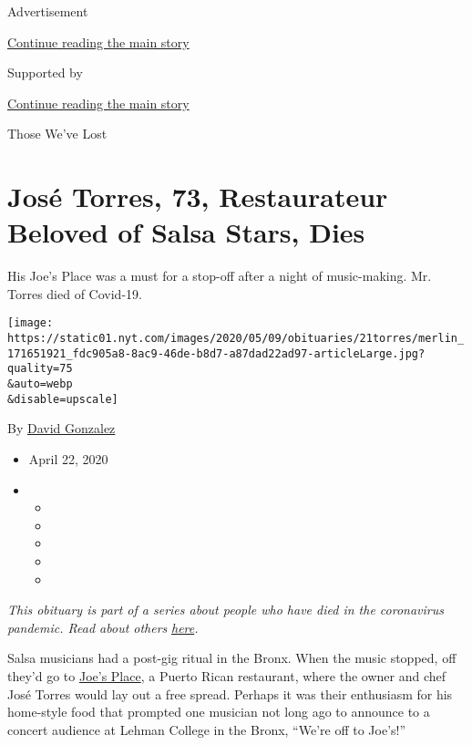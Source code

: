 Advertisement

\protect\hyperlink{after-top}{Continue reading the main story}

Supported by

\protect\hyperlink{after-sponsor}{Continue reading the main story}

Those We've Lost

\hypertarget{josuxe9-torres-73-restaurateur-beloved-of-salsa-stars-dies}{%
\section{José Torres, 73, Restaurateur Beloved of Salsa Stars,
Dies}\label{josuxe9-torres-73-restaurateur-beloved-of-salsa-stars-dies}}

His Joe's Place was a must for a stop-off after a night of music-making.
Mr. Torres died of Covid-19.

\texttt{[image: https://static01.nyt.com/images/2020/05/09/obituaries/21torres/merlin\_171651921\_fdc905a8-8ac9-46de-b8d7-a87dad22ad97-articleLarge.jpg?quality=75\\\&auto=webp\\\&disable=upscale]}

By \href{https://www.nytimes.com/by/david-gonzalez}{David Gonzalez}

\begin{itemize}
\item
  April 22, 2020
\item
  \begin{itemize}
  \item
  \item
  \item
  \item
  \item
  \end{itemize}
\end{itemize}

\emph{This obituary is part of a series about people who have died in
the coronavirus pandemic. Read about others}
\href{https://www.nytimes.com/series/people-who-have-died-of-the-coronavirus}{\emph{here}}\emph{.}

Salsa musicians had a post-gig ritual in the Bronx. When the music
stopped, off they'd go to
\href{http://www.joesplacebronx.com/our-place/}{Joe's Place}, a Puerto
Rican restaurant, where the owner and chef José Torres would lay out a
free spread. Perhaps it was their enthusiasm for his home-style food
that prompted one musician not long ago to announce to a concert
audience at Lehman College in the Bronx, ``We're off to Joe's!''

